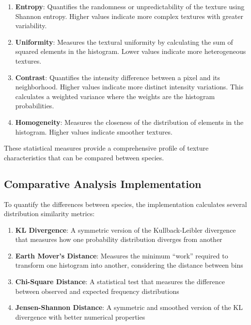 \documentclass[a4paper,12pt]{report}
\begin{document}
\begin{enumerate}
    \item \textbf{Entropy}: Quantifies the randomness or unpredictability of the texture using Shannon entropy. Higher values indicate more complex textures with greater variability.

    \item \textbf{Uniformity}: Measures the textural uniformity by calculating the sum of squared elements in the histogram. Lower values indicate more heterogeneous textures.

    \item \textbf{Contrast}: Quantifies the intensity difference between a pixel and its neighborhood. Higher values indicate more distinct intensity variations. This calculates a weighted variance where the weights are the histogram probabilities.

    \item \textbf{Homogeneity}: Measures the closeness of the distribution of elements in the histogram. Higher values indicate smoother textures.
\end{enumerate}

These statistical measures provide a comprehensive profile of texture characteristics that can be compared between species.

\subsection{Comparative Analysis Implementation}

To quantify the differences between species, the implementation calculates several distribution similarity metrics:

\begin{enumerate}
    \item \textbf{KL Divergence}: A symmetric version of the Kullback-Leibler divergence that measures how one probability distribution diverges from another

    \item \textbf{Earth Mover's Distance}: Measures the minimum ``work'' required to transform one histogram into another, considering the distance between bins

    \item \textbf{Chi-Square Distance}: A statistical test that measures the difference between observed and expected frequency distributions

    \item \textbf{Jensen-Shannon Distance}: A symmetric and smoothed version of the KL divergence with better numerical properties
\end{enumerate}
\end{document}
